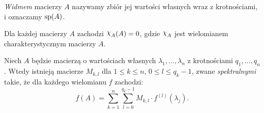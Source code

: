 %
\begin{definition}
  \emph{Widmem} macierzy $A$ nazywamy zbiór jej wartości własnych wraz z krotnościami, i oznaczamy $\operatorname{sp} (A)$.
\end{definition}
%
\begin{theorem} \label{T: H-C}
  Dla każdej macierzy $A$ zachodzi $\mychi_A(A) = 0$, gdzie $\mychi_A$ jest wielomianem charakterystycznym macierzy $A$.
\end{theorem}
%
\begin{theorem}
  Niech $A$ będzie macierzą o wartościach własnych $\lambda_1,\ldots,\lambda_n$ z krotnościami $q_1,\ldots,q_n$. Wtedy 
  istnieją macierze $M_{k,l}$ dla $1 \leq k \leq n$, $0 \leq l \leq q_k-1$, zwane \emph{spektralnymi} takie, że dla 
  każdego wielomianu $f$ zachodzi:
  \begin{equation*}
    f(A) = \sum_{k=1}^{n} \sum_{l=0}^{q_k-1} M_{k,l} \cdot f^{(l)}(\lambda_j).
  \end{equation*}
\end{theorem}
%
